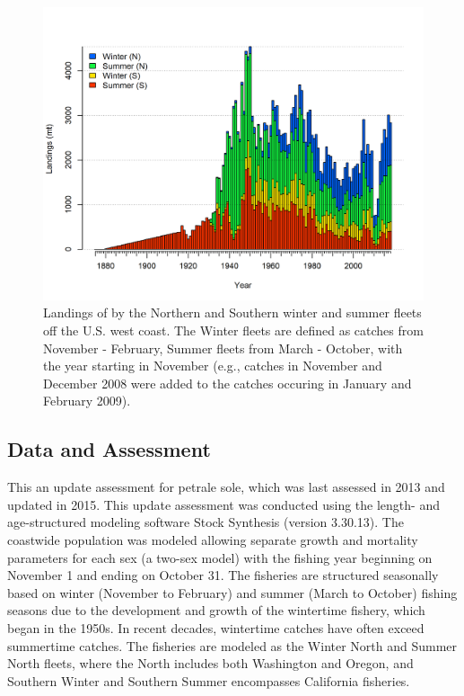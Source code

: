 \documentclass[12pt,]{article}
\begin{document}
\FloatBarrier

\begin{figure}
\centering
\includegraphics{r4ss/plots_mod1/catch2 landings stacked.png}
\caption{Landings of by the Northern and Southern winter and summer
fleets off the U.S. west coast. The Winter fleets are defined as catches
from November - February, Summer fleets from March - October, with the
year starting in November (e.g., catches in November and December 2008
were added to the catches occuring in January and February 2009).
\label{fig:Exec_catch1}}
\end{figure}

\FloatBarrier

\subsection*{Data and Assessment}\label{data-and-assessment}

This an update assessment for petrale sole, which was last assessed in
2013 and updated in 2015. This update assessment was conducted using the
length- and age-structured modeling software Stock Synthesis (version
3.30.13). The coastwide population was modeled allowing separate growth
and mortality parameters for each sex (a two-sex model) with the fishing
year beginning on November 1 and ending on October 31. The fisheries are
structured seasonally based on winter (November to February) and summer
(March to October) fishing seasons due to the development and growth of
the wintertime fishery, which began in the 1950s. In recent decades,
wintertime catches have often exceed summertime catches. The fisheries
are modeled as the Winter North and Summer North fleets, where the North
includes both Washington and Oregon, and Southern Winter and Southern
Summer encompasses California fisheries.
\end{document}
